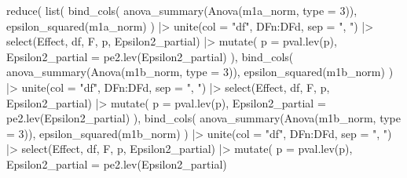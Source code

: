 \documentclass[
  bookmarksnumbered]{article}
\newenvironment{Shaded}{\begin{snugshade}}{\end{snugshade}}
\newcommand{\AttributeTok}[1]{\textcolor[rgb]{0.80,0.80,0.80}{#1}}
\newcommand{\DecValTok}[1]{\textcolor[rgb]{0.86,0.86,0.80}{#1}}
\newcommand{\FunctionTok}[1]{\textcolor[rgb]{0.94,0.94,0.56}{#1}}
\newcommand{\NormalTok}[1]{\textcolor[rgb]{0.80,0.80,0.80}{#1}}
\newcommand{\SpecialCharTok}[1]{\textcolor[rgb]{0.86,0.64,0.64}{#1}}
\newcommand{\StringTok}[1]{\textcolor[rgb]{0.80,0.58,0.58}{#1}}
\begin{document}
\begin{Shaded}
\begin{Highlighting}[]
\FunctionTok{reduce}\NormalTok{(}
  \FunctionTok{list}\NormalTok{(}
    \FunctionTok{bind\_cols}\NormalTok{(}
      \FunctionTok{anova\_summary}\NormalTok{(}\FunctionTok{Anova}\NormalTok{(m1a\_norm, }\AttributeTok{type =} \DecValTok{3}\NormalTok{)),}
      \FunctionTok{epsilon\_squared}\NormalTok{(m1a\_norm)}
\NormalTok{    ) }\SpecialCharTok{|\textgreater{}}
      \FunctionTok{unite}\NormalTok{(}\AttributeTok{col =} \StringTok{"df"}\NormalTok{, DFn}\SpecialCharTok{:}\NormalTok{DFd, }\AttributeTok{sep =} \StringTok{", "}\NormalTok{) }\SpecialCharTok{|\textgreater{}}
      \FunctionTok{select}\NormalTok{(Effect, df, F, p, Epsilon2\_partial) }\SpecialCharTok{|\textgreater{}}
      \FunctionTok{mutate}\NormalTok{(}
        \AttributeTok{p =} \FunctionTok{pval.lev}\NormalTok{(p),}
        \AttributeTok{Epsilon2\_partial =} \FunctionTok{pe2.lev}\NormalTok{(Epsilon2\_partial)}
\NormalTok{      ),}
    \FunctionTok{bind\_cols}\NormalTok{(}
      \FunctionTok{anova\_summary}\NormalTok{(}\FunctionTok{Anova}\NormalTok{(m1b\_norm, }\AttributeTok{type =} \DecValTok{3}\NormalTok{)),}
      \FunctionTok{epsilon\_squared}\NormalTok{(m1b\_norm)}
\NormalTok{    ) }\SpecialCharTok{|\textgreater{}}
      \FunctionTok{unite}\NormalTok{(}\AttributeTok{col =} \StringTok{"df"}\NormalTok{, DFn}\SpecialCharTok{:}\NormalTok{DFd, }\AttributeTok{sep =} \StringTok{", "}\NormalTok{) }\SpecialCharTok{|\textgreater{}}
      \FunctionTok{select}\NormalTok{(Effect, df, F, p, Epsilon2\_partial) }\SpecialCharTok{|\textgreater{}}
      \FunctionTok{mutate}\NormalTok{(}
        \AttributeTok{p =} \FunctionTok{pval.lev}\NormalTok{(p),}
        \AttributeTok{Epsilon2\_partial =} \FunctionTok{pe2.lev}\NormalTok{(Epsilon2\_partial)}
\NormalTok{      ),}
    \FunctionTok{bind\_cols}\NormalTok{(}
      \FunctionTok{anova\_summary}\NormalTok{(}\FunctionTok{Anova}\NormalTok{(m1b\_norm, }\AttributeTok{type =} \DecValTok{3}\NormalTok{)),}
      \FunctionTok{epsilon\_squared}\NormalTok{(m1b\_norm)}
\NormalTok{    ) }\SpecialCharTok{|\textgreater{}}
      \FunctionTok{unite}\NormalTok{(}\AttributeTok{col =} \StringTok{"df"}\NormalTok{, DFn}\SpecialCharTok{:}\NormalTok{DFd, }\AttributeTok{sep =} \StringTok{", "}\NormalTok{) }\SpecialCharTok{|\textgreater{}}
      \FunctionTok{select}\NormalTok{(Effect, df, F, p, Epsilon2\_partial) }\SpecialCharTok{|\textgreater{}}
      \FunctionTok{mutate}\NormalTok{(}
        \AttributeTok{p =} \FunctionTok{pval.lev}\NormalTok{(p),}
        \AttributeTok{Epsilon2\_partial =} \FunctionTok{pe2.lev}\NormalTok{(Epsilon2\_partial)}

\end{Highlighting}
\end{Shaded}
\end{document}
